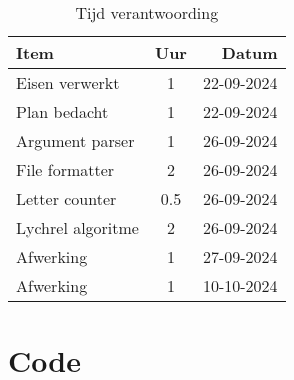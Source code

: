 \documentclass[10pt]{article}
\begin{document}
\begin{table}[H]
      \begin{center}
            \begin{tabular}{ l c r }
                  Item              & Uur & Datum      \\ \hline
                  Eisen verwerkt    & 1   & 22-09-2024 \\
                  Plan bedacht      & 1   & 22-09-2024 \\
                  Argument parser   & 1   & 26-09-2024 \\
                  File formatter    & 2   & 26-09-2024 \\
                  Letter counter    & 0.5 & 26-09-2024 \\
                  Lychrel algoritme & 2   & 26-09-2024 \\
                  Afwerking         & 1   & 27-09-2024 \\
                  Afwerking         & 1   & 10-10-2024 \\
            \end{tabular}

            \caption{Tijd verantwoording}
            \label{tab:time}
      \end{center}
\end{table}

\section{Code}\label{sec:code}

\end{document}
